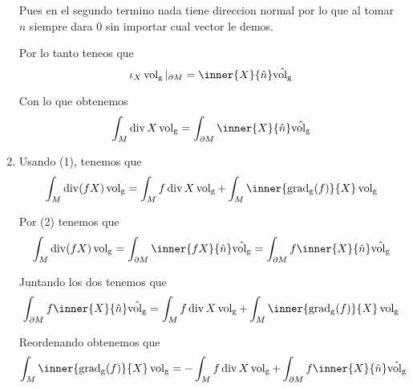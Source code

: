 \documentclass[a4paper,oneside,10.5pt]{USMArt}
\DeclareMathOperator{\volg}{vol_g}
\DeclareMathOperator{\dive}{div}
\begin{document}
\begin{sol}
\begin{enumerate}
          Pues en el segundo termino nada tiene direccion normal por lo que al tomar $\hat{n}$ siempre dara 0 sin importar cual vector le demos.

          Por lo tanto teneos que
          \begin{equation*}
            \iota_{X} \volg |_{\partial M} = \inner{X}{\hat{n}} \hat{\volg}
          \end{equation*}

          Con lo que obtenemos
          \begin{equation*}
            \int_{M} \dive X \volg = \int_{\partial M} \inner{X}{\hat{n}} \hat{\volg}
          \end{equation*}

    \item Usando (1), tenemos que
          \begin{equation*}
            \int_{M} \dive(fX) \volg  = \int_{M} f \dive X \volg + \int_{M} \inner{\operatorname{grad_{g}}(f)}{X} \volg
          \end{equation*}

          Por (2) tenemos que
          \begin{equation*}
            \int_{M} \dive(fX) \volg = \int_{\partial M} \inner{fX}{\hat{n}} \hat{\volg} = \int_{\partial M} f \inner{X}{\hat{n}} \hat{\volg}
          \end{equation*}

          Juntando los dos tenemos que
          \begin{equation*}
            \int_{\partial M} f \inner{X}{\hat{n}} \hat{\volg} = \int_{M} f \dive X \volg + \int_{M} \inner{\operatorname{grad_{g}}(f)}{X} \volg
          \end{equation*}

          Reordenando obtenemos que
          \begin{equation*}
            \int_{M} \inner{\operatorname{grad_{g}}(f)}{X} \volg = - \int_{M} f \dive X \volg + \int_{\partial M} f \inner{X}{\hat{n}} \hat{\volg}
          \end{equation*}
  \end{enumerate}
\end{sol}
\end{document}
